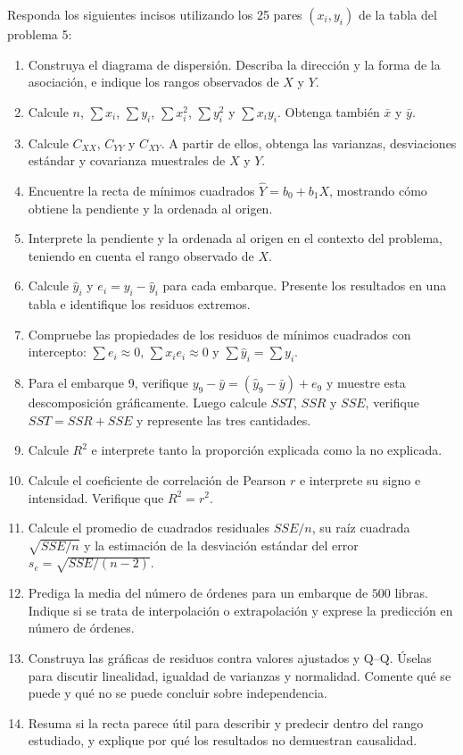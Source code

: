 Responda los siguientes incisos utilizando los 25 pares $(x_i,y_i)$ de la tabla del problema 5:
\begin{enumerate}
    \item[\textbf{a)}] Construya el diagrama de dispersión. Describa la dirección y la forma de la asociación, e indique los rangos observados de $X$ y $Y$.
    \item[\textbf{b)}] Calcule $n$, $\sum x_i$, $\sum y_i$, $\sum x_i^2$, $\sum y_i^2$ y $\sum x_iy_i$. Obtenga también $\bar x$ y $\bar y$.
    \item[\textbf{c)}] Calcule $C_{XX}$, $C_{YY}$ y $C_{XY}$. A partir de ellos, obtenga las varianzas, desviaciones estándar y covarianza muestrales de $X$ y $Y$.
    \item[\textbf{d)}] Encuentre la recta de mínimos cuadrados $\widehat Y=b_0+b_1X$, mostrando cómo obtiene la pendiente y la ordenada al origen.
    \item[\textbf{e)}] Interprete la pendiente y la ordenada al origen en el contexto del problema, teniendo en cuenta el rango observado de $X$.
    \item[\textbf{f)}] Calcule $\widehat y_i$ y $e_i=y_i-\widehat y_i$ para cada embarque. Presente los resultados en una tabla e identifique los residuos extremos.
    \item[\textbf{g)}] Compruebe las propiedades de los residuos de mínimos cuadrados con intercepto: $\sum e_i\approx0$, $\sum x_ie_i\approx0$ y $\sum\widehat y_i=\sum y_i$.
    \item[\textbf{h)}] Para el embarque 9, verifique $y_9-\bar y=(\widehat y_9-\bar y)+e_9$ y muestre esta descomposición gráficamente. Luego calcule $SST$, $SSR$ y $SSE$, verifique $SST=SSR+SSE$ y represente las tres cantidades.
    \item[\textbf{i)}] Calcule $R^2$ e interprete tanto la proporción explicada como la no explicada.
    \item[\textbf{j)}] Calcule el coeficiente de correlación de Pearson $r$ e interprete su signo e intensidad. Verifique que $R^2=r^2$.
    \item[\textbf{k)}] Calcule el promedio de cuadrados residuales $SSE/n$, su raíz cuadrada $\sqrt{SSE/n}$ y la estimación de la desviación estándar del error $s_e=\sqrt{SSE/(n-2)}$.
    \item[\textbf{l)}] Prediga la media del número de órdenes para un embarque de $500$ libras. Indique si se trata de interpolación o extrapolación y exprese la predicción en número de órdenes.
    \item[\textbf{m)}] Construya las gráficas de residuos contra valores ajustados y Q--Q. Úselas para discutir linealidad, igualdad de varianzas y normalidad. Comente qué se puede y qué no se puede concluir sobre independencia.
    \item[\textbf{n)}] Resuma si la recta parece útil para describir y predecir dentro del rango estudiado, y explique por qué los resultados no demuestran causalidad.
\end{enumerate}

